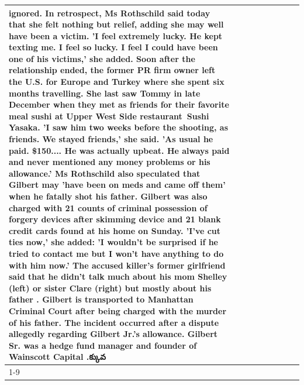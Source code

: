 \begin{table}[H]
\begin{tabular}{lllrlllll}
ignored. In retrospect, Ms Rothschild said today that she felt nothing but relief, adding she may well have been a victim. 'I feel extremely lucky. He kept texting me. I feel so lucky. I feel I could have been one of his victims,' she added. Soon after the relationship ended, the former PR firm owner left the U.S. for Europe and Turkey where she spent six months  travelling. She last saw Tommy in late December when they met as friends for their favorite meal sushi at Upper West Side restaurant Sushi Yasaka. 'I saw him two weeks before the shooting, as friends. We stayed friends,' she said. 'As usual he paid. \$150.... He was actually upbeat. He always paid and never mentioned any money problems or his allowance.' Ms Rothschild also speculated that Gilbert may 'have been on meds and came off them' when he fatally shot his father. Gilbert was also charged with 21 counts of criminal possession of forgery devices after skimming device and 21 blank credit cards found at his home on Sunday. 'I've cut ties now,' she added: 'I wouldn’t be surprised if he tried to contact me but I won’t have anything to do with him now.' The accused killer's former girlfriend said that he didn't talk much about his mom Shelley (left) or sister Clare (right) but mostly about his father . Gilbert is transported to Manhattan Criminal Court  after being charged with the murder of his father. The incident occurred after a dispute allegedly regarding Gilbert Jr.'s allowance. Gilbert Sr. was a hedge fund manager and founder of Wainscott Capital .క్కువ \\
\cline{1-9}

\end{tabular}
\end{table}
